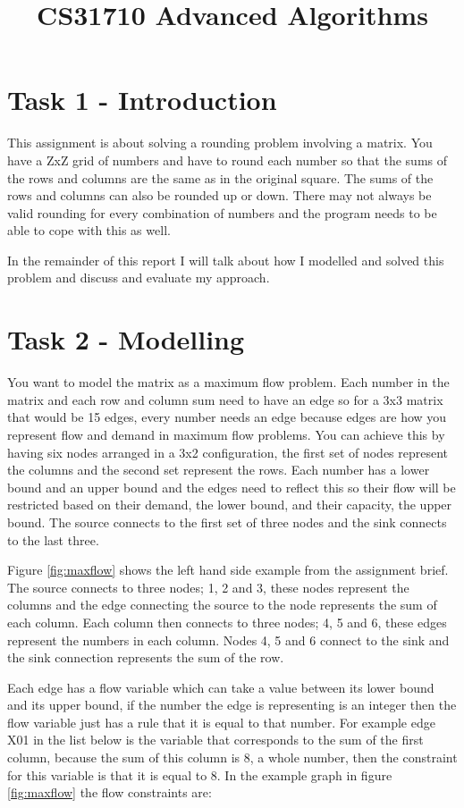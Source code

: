 \documentclass[10pt]{article}
\title {CS31710 Advanced Algorithms}
\begin{document}
\maketitle

\section*{Task 1 - Introduction}

This assignment is about solving a rounding problem involving a matrix. You have a ZxZ grid of numbers and have to round each number so that the sums of the rows and columns are the same as in the original square. The sums of the rows and columns can also be rounded up or down. There may not always be valid rounding for every combination of numbers and the program needs to be able to cope with this as well. 

In the remainder of this report I will talk about how I modelled and solved this problem and discuss and evaluate my approach.

\section*{Task 2 - Modelling}

You want to model the matrix as a maximum flow problem. Each number in the matrix and each row and column sum need to have an edge so for a 3x3 matrix that would be 15 edges, every number needs an edge because edges are how you represent flow and demand in maximum flow problems. You can achieve this by having six nodes arranged in a 3x2 configuration, the first set of nodes represent the columns and the second set represent the rows. Each number has a lower bound and an upper bound and the edges need to reflect this so their flow will be restricted based on their demand, the lower bound, and their capacity, the upper bound. The source connects to the first set of three nodes and the sink connects to the last three.

Figure \ref{fig:maxflow} shows the left hand side example from the assignment brief. The source connects to three nodes; 1, 2 and 3, these nodes represent the columns and the edge connecting the source to the node represents the sum of each column. Each column then connects to three nodes; 4, 5 and 6, these edges represent the numbers in each column. Nodes 4, 5 and 6 connect to the sink and the sink connection represents the sum of the row.

Each edge has a flow variable which can take a value between its lower bound and its upper bound, if the number the edge is representing is an integer then the flow variable just has a rule that it is equal to that number. For example edge X01 in the list below is the variable that corresponds to the sum of the first column, because the sum of this column is 8, a whole number, then the constraint for this variable is that it is equal to 8. In the example graph in figure \ref{fig:maxflow} the flow constraints are:
\end{document}
